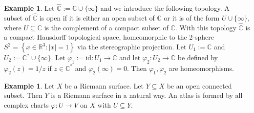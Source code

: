 \documentclass[12pt,a4paper]{book}
\theoremstyle{definition}
\newtheorem{exam}[defn]{Example}
\begin{document}
\begin{exam}
    Let $\widehat{\mathbb{C}}:=\mathbb{C} \cup\{\infty\}$ and we introduce the following topology. A subset of $\widehat{\mathbb{C}}$ is open if it is either an open subset of $\mathbb{C}$ or it is of the form $U \cup\{\infty\}$, where $U \subseteq \mathbb{C}$ is the complement of a compact subset of $\mathbb{C}$. With this topology $\widehat{\mathbb{C}}$ is a compact Hausdorff topological space, homeomorphic to the 2-sphere $S^2=\left\{x \in \mathbb{R}^3:|x|=1\right\}$ via the stereographic projection. Let $U_1:=\mathbb{C}$ and $U_2:=\mathbb{C}^* \cup\{\infty\}$. Let $\varphi_1:=\mathrm{id}: U_1 \rightarrow \mathbb{C}$ and let $\varphi_2: U_2 \rightarrow \mathbb{C}$ be defined by $\varphi_2(z)=1 / z$ if $z \in \mathbb{C}^*$ and $\varphi_2(\infty)=0$. Then $\varphi_1, \varphi_2$ are homeomorphisms.
\end{exam}
\begin{exam}
    Let $X$ be a Riemann surface. Let $Y \subseteq X$ be an open connected subset. Then $Y$ is a Riemann surface in a natural way. An atlas is formed by all complex charts $\varphi: U \rightarrow V$ on $X$ with $U \subseteq Y$.
\end{exam}
\end{document}
